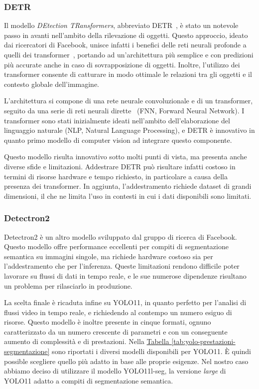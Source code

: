 \documentclass[12pt]{report}
\begin{document}
\subsubsection{DETR}
\label{sec:detr}

Il modello \textit{DEtection TRansformers}, abbreviato DETR~\cite{carion2020end}, è stato un notevole passo in avanti nell'ambito della rilevazione di oggetti. Questo approccio, ideato dai ricercatori di Facebook, unisce infatti i benefici delle reti neurali profonde a quelli dei transformer~\cite{10.1145/3505244}, portando ad un'architettura più semplice e con predizioni più accurate anche in caso di sovrapposizione di oggetti. Inoltre, l'utilizzo dei transformer consente di catturare in modo ottimale le relazioni tra gli oggetti e il contesto globale dell'immagine.

L'architettura si compone di una rete neurale convoluzionale e di un transformer, seguito da una serie di reti neurali dirette~\cite{article_890416} (FNN, Forward Neural Network). I transformer sono stati inizialmente ideati nell'ambito dell'elaborazione del linguaggio naturale (NLP, Natural Language Processing), e DETR è innovativo in quanto primo modello di computer vision ad integrare questo componente.

Questo modello risulta innovativo sotto molti punti di vista, ma presenta anche diverse sfide e limitazioni. Addestrare DETR può risultare infatti costoso in termini di risorse hardware e tempo richiesto, in particolare a causa della presenza dei transformer. In aggiunta, l'addestramento richiede dataset di grandi dimensioni, il che ne limita l'uso in contesti in cui i dati disponibili sono limitati.

\subsubsection{Detectron2}
\label{sec:detectron}

Detectron2 è un altro modello sviluppato dal gruppo di ricerca di Facebook. Questo modello offre performance eccellenti per compiti di segmentazione semantica su immagini singole, ma richiede hardware costoso sia per l'addestramento che per l'inferenza. Queste limitazioni rendono difficile poter lavorare su flussi di dati in tempo reale, e le sue numerose dipendenze risultano un problema per rilasciarlo in produzione.

\vspace{10pt}

La scelta finale è ricaduta infine su YOLO11, in quanto perfetto per l'analisi di flussi video in tempo reale, e richiedendo al contempo un numero esiguo di risorse. Questo modello è inoltre presente in cinque formati, ognuno caratterizzato da un numero crescente di parametri e con un conseguente aumento di complessità e di prestazioni. Nella \hyperref[tab:yolo-prestazioni-segmentazione]{Tabella \ref{tab:yolo-prestazioni-segmentazione}} sono riportati i diversi modelli disponibili per YOLO11. È quindi possible scegliere quello più adatto in base alle proprie esigenze. Nel nostro caso abbiamo deciso di utilizzare il modello YOLO11l-seg, la versione \textit{large} di YOLO11 adatto a compiti di segmentazione semantica.
\end{document}
